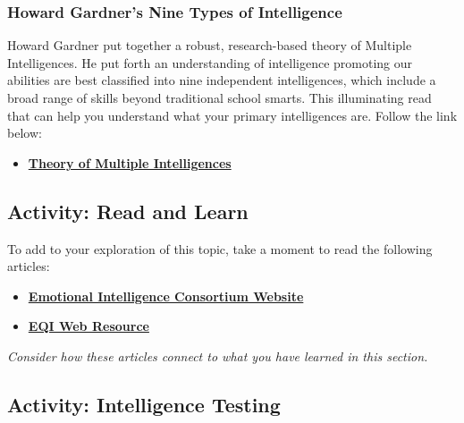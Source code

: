 \documentclass[
]{book}
\providecommand{\tightlist}{%
  \setlength{\itemsep}{0pt}\setlength{\parskip}{0pt}}
\begin{document}
\hypertarget{howard-gardners-nine-types-of-intelligence}{%
\subsubsection*{Howard Gardner's Nine Types of Intelligence}\label{howard-gardners-nine-types-of-intelligence}}

Howard Gardner put together a robust, research-based theory of Multiple Intelligences. He put forth an understanding of intelligence promoting our abilities are best classified into nine independent intelligences, which include a broad range of skills beyond traditional school smarts. This illuminating read that can help you understand what your primary intelligences are. Follow the link below:

\begin{itemize}
\tightlist
\item
  \href{https://www.niu.edu/citl/resources/guides/instructional-guide/gardners-theory-of-multiple-intelligences.shtml}{\textbf{Theory of Multiple Intelligences}}
\end{itemize}

\hypertarget{activity-read-and-learn}{%
\subsection*{Activity: Read and Learn}\label{activity-read-and-learn}}

\begin{reflect}
To add to your exploration of this topic, take a moment to read the following articles:

\begin{itemize}
\item
  \href{http://www.eiconsortium.org/}{\textbf{Emotional Intelligence Consortium Website}}
\item
  \href{http://eqi.org/}{\textbf{EQI Web Resource}}
\end{itemize}

\emph{Consider how these articles connect to what you have learned in this section.}
\end{reflect}

\hypertarget{activity-intelligence-testing}{%
\subsection*{Activity: Intelligence Testing}\label{activity-intelligence-testing}}
\end{document}
